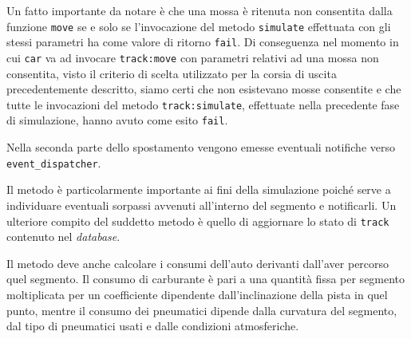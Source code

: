 Un fatto importante da notare è che una mossa è ritenuta non consentita dalla funzione \texttt{move} se e solo se l'invocazione del metodo \texttt{simulate} effettuata con gli stessi parametri ha come valore di ritorno \texttt{fail}.
Di conseguenza nel momento in cui \texttt{car} va ad invocare \texttt{track:move} con parametri relativi ad una mossa non consentita, visto il criterio di scelta utilizzato per la corsia di uscita precedentemente descritto, siamo certi che non esistevano mosse consentite e che tutte le invocazioni del metodo \texttt{track:simulate}, effettuate nella precedente fase di simulazione, hanno avuto come esito \texttt{fail}.

Nella seconda parte dello spostamento vengono emesse eventuali notifiche verso \texttt{event\_dispatcher}.

Il metodo  è particolarmente importante ai fini della simulazione poiché serve a individuare eventuali sorpassi avvenuti all'interno del segmento e notificarli. Un ulteriore compito del suddetto metodo è quello di aggiornare lo stato di \texttt{track} contenuto nel \textit{database}.

Il metodo  deve anche calcolare i consumi dell'auto derivanti dall'aver percorso quel segmento.
Il consumo di carburante è pari a una quantità fissa per segmento moltiplicata per un coefficiente dipendente dall'inclinazione della pista in quel punto, mentre il consumo dei pneumatici dipende dalla curvatura del segmento, dal tipo di pneumatici usati e dalle condizioni atmosferiche.

